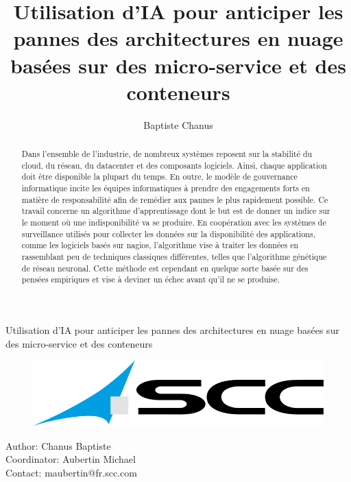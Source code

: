 \documentclass[10pt,a4paper,oneside]{article}
\author{Baptiste Chanus}
\title{Utilisation d'IA pour anticiper les pannes des architectures en nuage basées sur des micro-service et des conteneurs}
\begin{document}
\begin{center}

\vspace{0.8cm}

\begin{Large}
Utilisation d'IA pour anticiper les pannes des architectures en nuage basées sur des micro-service et des conteneurs
\end{Large}
\end{center}

\vspace{0.8cm}

\begin{figure}[h!]
\centering
\includegraphics[scale=0.5]{./images/PNG/scc-logo.png}
\end{figure}

\vspace{0.8cm}

Author: Chanus Baptiste\\
Coordinator: Aubertin Michael\\
Contact: maubertin@fr.scc.com\\

\vspace{0.8cm}

\begin{abstract}
Dans l’ensemble de l’industrie, de nombreux systèmes reposent sur la stabilité du cloud, du réseau, du datacenter et des composants logiciels. Ainsi, chaque application doit être disponible la plupart du temps. En outre, le modèle de gouvernance informatique incite les équipes informatiques à prendre des engagements forts en matière de responsabilité afin de remédier aux pannes le plus rapidement possible. Ce travail concerne un algorithme d’apprentissage dont le but est de donner un indice sur le moment où une indisponibilité va se produire. En coopération avec les systèmes de surveillance utilisés pour collecter les données sur la disponibilité des applications, comme les logiciels basés sur nagios, l’algorithme vise à traiter les données en rassemblant peu de techniques classiques différentes, telles que l’algorithme génétique de réseau neuronal. Cette méthode est cependant en quelque sorte basée sur des pensées empiriques et vise à deviner un échec avant qu'il ne se produise.
\end{abstract}
\end{document}
